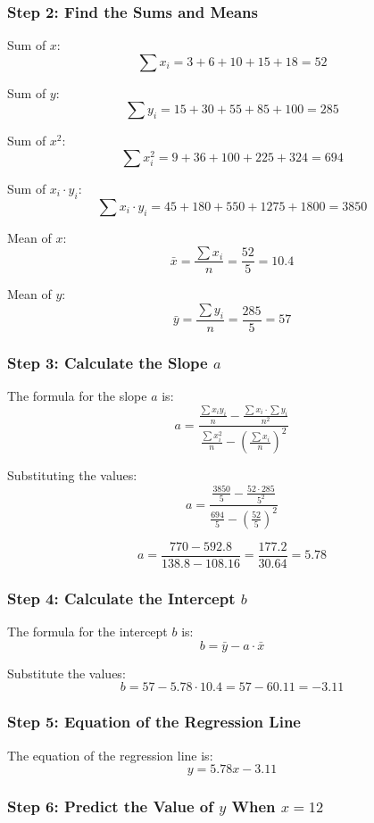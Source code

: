 \documentclass{article}
\begin{document}
\subsubsection*{Step 2: Find the Sums and Means}

\hspace{15pt}Sum of $x$:
\[
\sum x_i = 3 + 6 + 10 + 15 + 18 = 52
\]

Sum of $y$:
\[
\sum y_i = 15 + 30 + 55 + 85 + 100 = 285
\]

Sum of $x^2$:
\[
\sum x_i^2 = 9 + 36 + 100 + 225 + 324 = 694
\]

Sum of $x_i \cdot y_i$:
\[
\sum x_i \cdot y_i = 45 + 180 + 550 + 1275 + 1800 = 3850
\]

Mean of $x$:
\[
\bar{x} = \frac{\sum x_i}{n} = \frac{52}{5} = 10.4
\]

Mean of $y$:
\[
\bar{y} = \frac{\sum y_i}{n} = \frac{285}{5} = 57
\]

\subsubsection*{Step 3: Calculate the Slope $a$}

The formula for the slope $a$ is:
\[
a = \frac{\frac{\sum x_i y_i}{n} - \frac{\sum x_i \cdot \sum y_i}{n^2}}{\frac{\sum x_i^2}{n} - (\frac{\sum x_i}{n})^2}
\]

Substituting the values:
\[
a = \frac{\frac{3850}{5} - \frac{52 \cdot 285}{5^2}}{\frac{694}{5} - \left( \frac{52}{5} \right)^2}
\]

\[
a = \frac{770 - 592.8}{138.8 - 108.16} = \frac{177.2}{30.64} = 5.78
\]

\subsubsection*{Step 4: Calculate the Intercept \(b\)}

The formula for the intercept \(b\) is:
\[
b = \bar{y} - a \cdot \bar{x}
\]

Substitute the values:
\[
b = 57 - 5.78 \cdot 10.4 = 57 - 60.11 = -3.11
\]

\subsubsection*{Step 5: Equation of the Regression Line}

The equation of the regression line is:
\[
y = 5.78x - 3.11
\]

\subsubsection*{Step 6: Predict the Value of \(y\) When \(x = 12\)}
\end{document}
